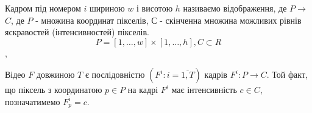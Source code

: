 Кадром під номером $i$ шириною $w$ і висотою $h$ називаємо відображення, де
$P$$\to$$C$, де $P$ - множина координат пікселів, $С$ - скінченна множина можливих рівнів
яскравостей (інтенсивностей) пікселів.
\begin{equation}
    P = [1, \ldots ,w]\times[1, \ldots, h], C \subset R
\end{equation},

Відео \(F\) довжиною \(T\)
є послідовністю \(\left( F^{i}:i = \overline{1,T} \right)\) кадрів
\(F^{i}:P \rightarrow C\). Той факт, що піксель з координатою
\(p \in P\) на кадрі \(F^{i}\) має інтенсивність \(c \in C\),
позначатимемо \(F_{p}^{i} = c\).

\clearpage